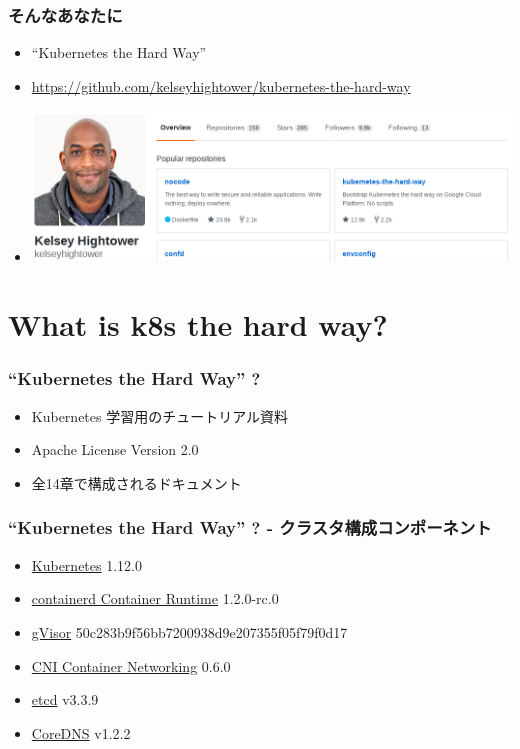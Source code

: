\documentclass[aspectratio=169,11pt,hyperref={colorlinks=true}]{beamer}
\begin{document}
\begin{frame}
  \frametitle{そんなあなたに}
  \begin{itemize}
    \item[] \Huge{``Kubernetes the Hard Way''}\large{}
    \item \url{https://github.com/kelseyhightower/kubernetes-the-hard-way}
    \item[] \includegraphics[height=40mm]{images/kelseyhightower_overview.png}
  \end{itemize}
\end{frame}

\section{What is k8s the hard way?}
\begin{frame}
  \frametitle{``Kubernetes the Hard Way'' ?}
  \begin{itemize}
    \item Kubernetes 学習用のチュートリアル資料
    \item Apache License Version 2.0
    \item 全14章で構成されるドキュメント
  \end{itemize}
\end{frame}

\begin{frame}
  \frametitle{``Kubernetes the Hard Way'' ? - クラスタ構成コンポーネント}
  \begin{itemize}
    \item \href{https://github.com/kubernetes/kubernetes}{Kubernetes} 1.12.0
    \item \href{https://github.com/containerd/containerd}{containerd Container Runtime} 1.2.0-rc.0
    \item \href{https://github.com/google/gvisor}{gVisor} 50c283b9f56bb7200938d9e207355f05f79f0d17
    \item \href{https://github.com/containernetworking/cni}{CNI Container Networking} 0.6.0
    \item \href{https://github.com/etcd-io/etcd}{etcd} v3.3.9
    \item \href{https://github.com/coredns/coredns}{CoreDNS} v1.2.2

  \end{itemize}
\end{frame}
\end{document}
